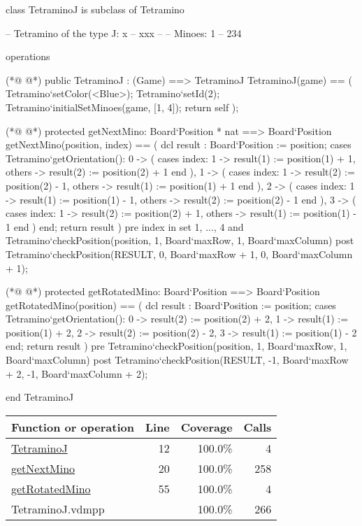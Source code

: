 \begin{vdmpp}[breaklines=true]
class TetraminoJ is subclass of Tetramino
  
 -- Tetramino of the type J: x
 --       xxx
 -- 
 -- Minoes:       1
 --        234

 
 operations
 
(*@
\label{TetraminoJ:12}
@*)
  public TetraminoJ : (Game) ==> TetraminoJ
  TetraminoJ(game) == (
   Tetramino`setColor(<Blue>);
   Tetramino`setId(2);
   Tetramino`initialSetMinoes(game, [1, 4]);
   return self
  );

(*@
\label{getNextMino:20}
@*)
  protected getNextMino: Board`Position * nat ==> Board`Position
  getNextMino(position, index) == (
   dcl result : Board`Position := position;
   cases Tetramino`getOrientation():
    0 -> (
     cases index:
      1 -> result(1) := position(1) + 1,
      others -> result(2) := position(2) + 1
     end
    ),
    1 -> (
     cases index:
      1 -> result(2) := position(2) - 1,
      others -> result(1) := position(1) + 1
     end
    ),
    2 -> (
     cases index:
      1 -> result(1) := position(1) - 1,
      others -> result(2) := position(2) - 1
     end
    ),
    3 -> (
     cases index:
      1 -> result(2) := position(2) + 1,
      others -> result(1) := position(1) - 1
     end
    )
   end;
   return result
  )
  pre index in set {1, ..., 4} 
   and Tetramino`checkPosition(position, 1, Board`maxRow, 1, Board`maxColumn)
  post Tetramino`checkPosition(RESULT, 0, Board`maxRow + 1, 0, Board`maxColumn + 1);

(*@
\label{getRotatedMino:55}
@*)
  protected getRotatedMino: Board`Position ==> Board`Position
  getRotatedMino(position) == (
   dcl result : Board`Position := position;
   cases Tetramino`getOrientation():
    0 -> result(2) := position(2) + 2,
    1 -> result(1) := position(1) + 2,
    2 -> result(2) := position(2) - 2,
    3 -> result(1) := position(1) - 2
   end;
   return result
  )
  pre Tetramino`checkPosition(position, 1, Board`maxRow, 1, Board`maxColumn)
  post Tetramino`checkPosition(RESULT, -1, Board`maxRow + 2, -1, Board`maxColumn + 2);

end TetraminoJ
\end{vdmpp}
\bigskip
\begin{longtable}{|l|r|r|r|}
\hline
Function or operation & Line & Coverage & Calls \\
\hline
\hline
\hyperref[TetraminoJ:12]{TetraminoJ} & 12&100.0\% & 4 \\
\hline
\hyperref[getNextMino:20]{getNextMino} & 20&100.0\% & 258 \\
\hline
\hyperref[getRotatedMino:55]{getRotatedMino} & 55&100.0\% & 4 \\
\hline
\hline
TetraminoJ.vdmpp & & 100.0\% & 266 \\
\hline
\end{longtable}

